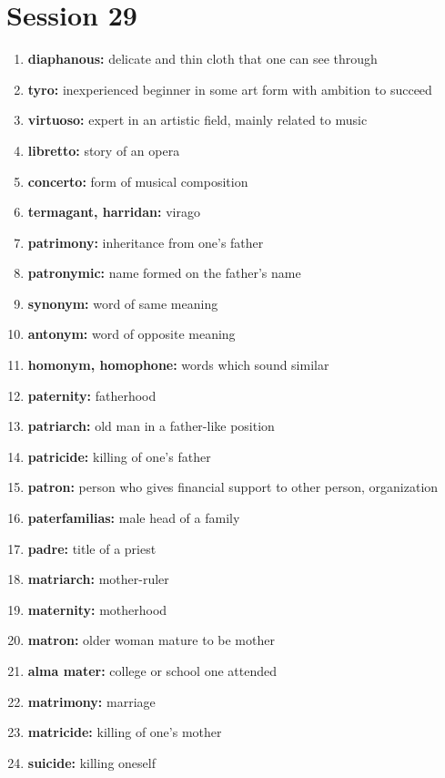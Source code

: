 \documentclass{article}
\begin{document}
\section{Session 29}
\begin{enumerate}
    \item \textbf{diaphanous: }{delicate and thin cloth that one can see through}
    \item \textbf{tyro: }{inexperienced beginner in some art form with ambition to succeed}
    \item \textbf{virtuoso: }{expert in an artistic field, mainly related to music}
    \item \textbf{libretto: }{story of an opera}
    \item \textbf{concerto: }{form of musical composition}
    \item \textbf{termagant, harridan: }{virago}
    \item \textbf{patrimony: }{inheritance from one's father}
    \item \textbf{patronymic: }{name formed on the father's name}
    \item \textbf{synonym: }{word of same meaning}
    \item \textbf{antonym: }{word of opposite meaning}
    \item \textbf{homonym, homophone: }{words which sound similar}
    \item \textbf{paternity: }{fatherhood}
    \item \textbf{patriarch: }{old man in a father-like position}
    \item \textbf{patricide: }{killing of one's father}
    \item \textbf{patron: }{person who gives financial support to other person, organization}
    \item \textbf{paterfamilias: }{male head of a family}
    \item \textbf{padre: }{title of a priest}
    \item \textbf{matriarch: }{mother-ruler}
    \item \textbf{maternity: }{motherhood}
    \item \textbf{matron: }{older woman mature to be mother}
    \item \textbf{alma mater: }{college or school one attended}
    \item \textbf{matrimony: }{marriage}
    \item \textbf{matricide: }{killing of one's mother}
    \item \textbf{suicide: }{killing oneself}

\end{enumerate}
\end{document}
